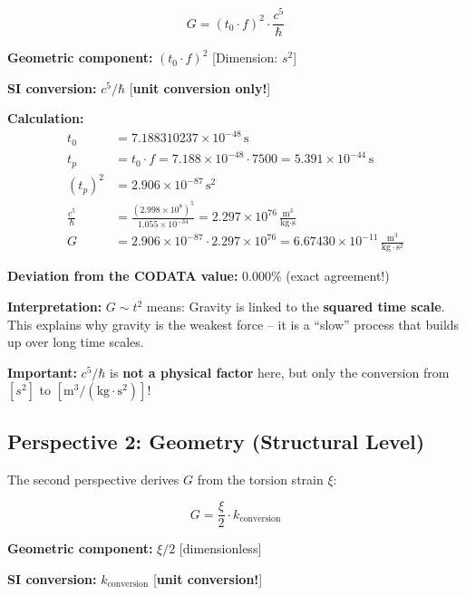 	\begin{equation}
		\boxed{G = (t_0 \cdot f)^2 \cdot \frac{c^5}{\hbar}}
	\end{equation}
	
	\textbf{Geometric component:} \((t_0 \cdot f)^2\) [Dimension: \(s^2\)]
	
	\textbf{SI conversion:} \(c^5/\hbar\) [\textbf{unit conversion only!}]
	
	\textbf{Calculation:}
	\begin{align}
		t_0 &= 7.188310237 \times 10^{-48}\,\text{s} \\
		t_p &= t_0 \cdot f = 7.188 \times 10^{-48} \cdot 7500 = 5.391 \times 10^{-44}\,\text{s} \\
		(t_p)^2 &= 2.906 \times 10^{-87}\,\text{s}^2 \\
		\frac{c^5}{\hbar} &= \frac{(2.998 \times 10^8)^5}{1.055 \times 10^{-34}} = 2.297 \times 10^{76}\,\frac{\text{m}^3}{\text{kg} \cdot \text{s}} \\
		G &= 2.906 \times 10^{-87} \cdot 2.297 \times 10^{76} = 6.67430 \times 10^{-11}\,\frac{\text{m}^3}{\text{kg} \cdot \text{s}^2}
	\end{align}
	
	\textbf{Deviation from the CODATA value:} \(0.000\%\) (exact agreement!)
	
	\textbf{Interpretation:} \(G \sim t^2\) means: Gravity is linked to the \textbf{squared time scale}. This explains why gravity is the weakest force -- it is a \enquote{slow} process that builds up over long time scales.
	
	\textbf{Important:} \(c^5/\hbar\) is \textbf{not a physical factor} here, but only the conversion from \([s^2]\) to \([\text{m}^3/(\text{kg} \cdot \text{s}^2)]\)!
	
	\subsection{Perspective 2: Geometry (Structural Level)}
	
	The second perspective derives \(G\) from the torsion strain \(\xi\):
	
	\begin{equation}
		\boxed{G = \frac{\xi}{2} \cdot k_{\text{conversion}}}
	\end{equation}
	
	\textbf{Geometric component:} \(\xi/2\) [dimensionless]
	
	\textbf{SI conversion:} \(k_{\text{conversion}}\) [\textbf{unit conversion!}]
	
